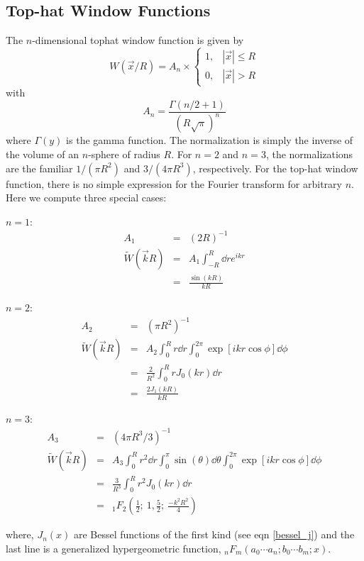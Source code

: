 \subsection{Top-hat Window Functions}
The $n$-dimensional tophat window function is given by
\begin{equation}
W(\vec x/R) = A_n
\times\left\{
\begin{array}{ll}
  1, & |\vec x|\le R\\
  0, & |\vec x|>R
\end{array}
\right.
\end{equation}
with
\begin{equation}
  A_n = \frac{\Gamma(n/2+1)}{(R\sqrt\pi)^n}
\end{equation}
where $\Gamma(y)$ is the gamma function.  The normalization is simply the
inverse of the volume of an $n$-sphere of radius $R$.   
For $n=2$ and $n=3$, the normalizations are the familiar 
$1/(\pi R^2)$ and $3/(4\pi R^3)$, respectively.
For the top-hat window function, there is no
simple expression for the Fourier transform for arbitrary $n$. 
Here we compute three special cases:
\begin{description}
  \item{$n=1$}:
    \begin{eqnarray}
      \label{tophat1D}
      A_1 &=& (2R)^{-1}\nonumber\\
      \widetilde W(\vec k R) &=& A_1\int_{-R}^{R}\dd r e^{ikr} \nonumber\\
      &=&\frac{\sin(kR)}{kR}
    \end{eqnarray}
  \item{$n=2$}:
    \begin{eqnarray}
      \label{tophat2D}
      A_2 &=& (\pi R^2)^{-1}\nonumber\\
      \widetilde W(\vec k R) &=& A_2\int_0^R r\dd r\int_0^{2\pi} \exp[ikr\cos\phi]\dd\phi\nonumber\\
      &=& \frac{2}{R^2}\int_0^R r J_0(kr)\dd r \nonumber\\
      &=& \frac{2J_1(kR)}{kR}
    \end{eqnarray}
  \item{$n=3$}: 
    \begin{eqnarray}
      \label{tophat3D}
      A_3 &=& (4\pi R^3/3)^{-1}\nonumber\\
      \widetilde W(\vec k R) &=& A_3\int_0^Rr^2\dd r\int_0^\pi \sin(\theta)\dd\theta\int_0^{2\pi}\exp[ikr\cos\phi]\dd\phi\nonumber\\
      &=& \frac{3}{R^3}\int_0^R r^2 J_0(kr)\dd r\nonumber\\
      &=& _1F_2(\frac{1}{2};\ 1,\frac{5}{2};\ \frac{-k^2R^2}{4})
    \end{eqnarray}
\end{description}
where, $J_n(x)$ are Bessel functions of the first kind (see eqn \ref{bessel_j})
and the last line is a generalized hypergeometric function, 
$_nF_m(a_0\cdots a_n;b_0\cdots b_m;x)$.  
